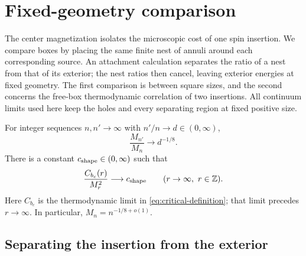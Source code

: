 \section{Fixed-geometry comparison}\label{sec:geometry}

The center magnetization isolates the microscopic cost of one spin
insertion.  We compare boxes by placing the same finite nest of annuli
around each corresponding source.  An attachment calculation separates
the ratio of a nest from that of its exterior; the nest ratios then
cancel, leaving exterior energies at fixed geometry.  The first comparison
is between square sizes, and the second concerns the free-box thermodynamic
correlation of two insertions.  All continuum limits used here keep the
holes and every separating region at fixed positive size.

\begin{proposition}
\label{geo:comparison}
For integer sequences \(n,n'\to\infty\) with \(n'/n\to d\in(0,\infty)\),
\begin{equation}\label{geo:center-ratio}
                  \frac{M_{n'}}{M_n}\longrightarrow d^{-1/8}.
\end{equation}
There is a constant \(c_{\rm shape}\in(0,\infty)\) such that
\begin{equation}\label{geo:bulk-ratio}
                  \frac{C_{b_c}(r)}{M_r^2}\longrightarrow c_{\rm shape}
                  \qquad(r\to\infty,\ r\in\mathbb Z).
\end{equation}
Here \(C_{b_c}\) is the thermodynamic limit in
\eqref{eq:critical-definition}; that limit precedes \(r\to\infty\).
In particular, \(M_n=n^{-1/8+o(1)}\).
\end{proposition}

\subsection{Separating the insertion from the exterior}

